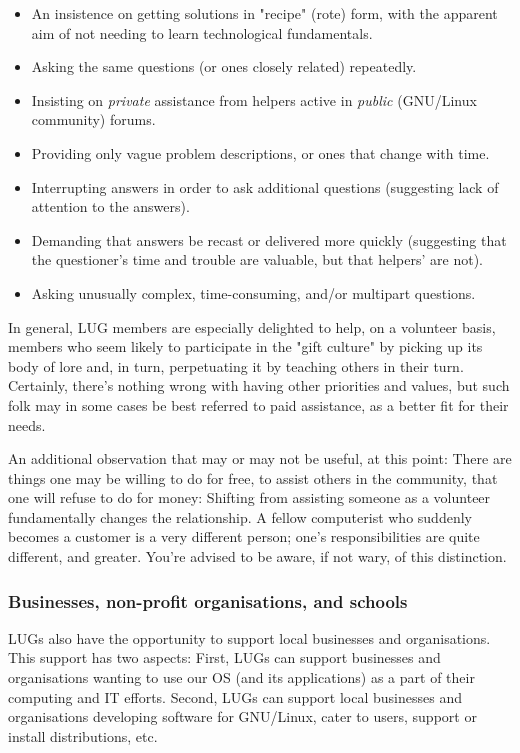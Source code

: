 \begin{itemize}
\item An insistence on getting solutions in "recipe" (rote) form, 
with the apparent aim of not needing to learn technological 
fundamentals.
\item Asking the same questions (or ones closely related) repeatedly.
\item Insisting on {\itshape private\/} assistance from helpers active in
{\itshape public\/} (GNU/Linux community) forums.
\item Providing only vague problem descriptions, or ones that change with time.
\item Interrupting answers in order to ask additional questions 
(suggesting lack of attention to the answers).
\item Demanding that answers be recast or delivered more quickly 
(suggesting that the questioner's time and trouble are 
valuable, but that helpers' are not).
\item Asking unusually complex, time-consuming, and/or multipart 
questions.
\end{itemize}


In general, LUG members are especially delighted to help, on a volunteer
basis, members who seem likely to participate in the "gift
culture" by picking up its body of lore and, in turn, perpetuating it
by teaching others in their turn.  Certainly, there's nothing wrong with
having other priorities and values, but such folk may in some cases be
best referred to paid assistance, as a better fit for their needs.

An additional observation that may or may not be useful, at this point:
There are things one may be willing to do for free, to assist others in the
community, that one will refuse to do for money:  Shifting from
assisting someone as a volunteer fundamentally changes the relationship.
A fellow computerist who suddenly becomes a customer is a very different
person; one's responsibilities are quite different, and greater.  You're
advised to be aware, if not wary, of this distinction.

\subsubsection{Businesses, non-profit organisations, and schools}

LUGs also have the opportunity to support local businesses and
organisations. This support has two aspects: First, LUGs can support
businesses and organisations wanting to use our OS (and its 
applications) as a part of their
computing and IT efforts. Second, LUGs can support local businesses
and organisations developing software for GNU/Linux, cater to users,
support or install distributions, etc.

